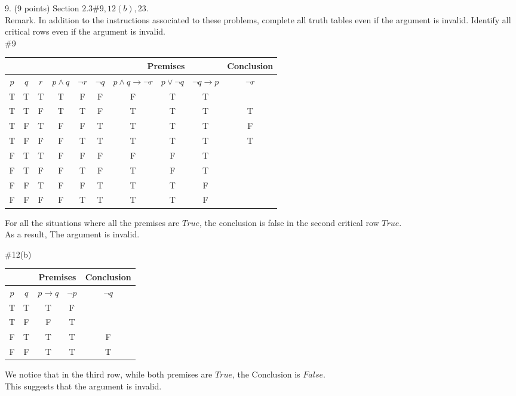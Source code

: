 \documentclass{article}
\begin{document}
9. (9 points) Section $2.3 \# 9,12(b), 23$.\\
Remark. In addition to the instructions associated to these problems, complete all truth tables even if the argument is invalid. Identify all critical rows even if the argument is invalid.\\
\#9\\
\begin{center}
    \begin{tabular}{|c|c|c|c|c|c|c|c|c|c|}
\hline
\multicolumn{3}{|c|}{} & \multicolumn{3}{|c|}{} & \multicolumn{3}{|c|}{Premises} & \multicolumn{1}{|c|}{Conclusion} \\
\hline
$p$ & $q$ & $r$ & $p \wedge q$ & $\neg r$ & $\neg q$ & $p \wedge q \rightarrow \neg r $&$ p \vee \neg q$ & $\neg q \rightarrow p$ & $\neg r$\\

\hline
T & T & T & T & F & F & F & T & T &  \\
T & T & F & T & T & F & T & T & T & T \\
T & F & T & F & F & T & T & T & T & F \\
T & F & F & F & T & T & T & T & T & T \\
F & T & T & F & F & F & F & F & T &  \\
F & T & F & F & T & F & T & F & T &  \\
F & F & T & F & F & T & T & T & F &  \\
F & F & F & F & T & T & T & T & F & \\
\hline
\end{tabular}
\end{center}
For all the situations where all the premises are $True$, the conclusion is false in the second critical row $True$.\\ 
As a result, The argument is invalid.

\#12(b)\\
\begin{center}
    \begin{tabular}{|c|c|c|c|c|}
    \hline
    \multicolumn{2}{|c|}{} &\multicolumn{2}{|c|}{Premises} &\multicolumn{1}{|c|}{Conclusion}\\
    \hline
        $p$ & $q$ & $p \rightarrow q$ & $\neg p$ & $\neg q$ \\
    \hline
        T & T & T & F &    \\
        T & F & F & T &    \\
        F & T & T & T & F  \\
        F & F & T & T & T  \\
    \hline
    \end{tabular}
\end{center}
We notice that in the third row, while both premises are $True$, the Conclusion is $False$.\\
This suggests that the argument is invalid.
\end{document}
